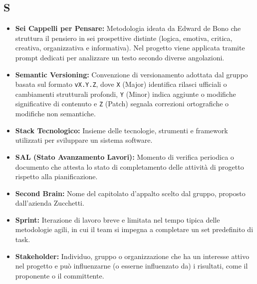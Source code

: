 \subsection*{S}
\begin{itemize}[leftmargin=*]
      \item \textbf{Sei Cappelli per Pensare:} Metodologia ideata da Edward de Bono che struttura il pensiero in sei prospettive distinte (logica, emotiva, critica, creativa, organizzativa e informativa). Nel progetto viene applicata tramite prompt dedicati per analizzare un testo secondo diverse angolazioni.
      \item \textbf{Semantic Versioning:} Convenzione di versionamento adottata dal
          gruppo basata sul formato \texttt{vX.Y.Z}, dove \texttt{X} (Major)
          identifica rilasci ufficiali o cambiamenti strutturali profondi,
          \texttt{Y} (Minor) indica aggiunte o modifiche significative di contenuto
          e \texttt{Z} (Patch) segnala correzioni ortografiche o modifiche non
          semantiche.
      \item \textbf{Stack Tecnologico:} Insieme delle tecnologie, strumenti e framework utilizzati per sviluppare un sistema software.
      \item \textbf{SAL (Stato Avanzamento Lavori):} Momento di verifica periodica o documento che attesta lo stato di completamento delle attività di progetto rispetto alla pianificazione.
      \item \textbf{Second Brain:} Nome del capitolato d'appalto scelto dal gruppo, proposto dall'azienda Zucchetti.
      \item \textbf{Sprint:} Iterazione di lavoro breve e limitata nel tempo tipica delle metodologie agili, in cui il team si impegna a completare un set predefinito di task.
      \item \textbf{Stakeholder:} Individuo, gruppo o organizzazione che ha un interesse attivo nel progetto e può influenzarne (o esserne influenzato da) i risultati, come il proponente o il committente.
\end{itemize}
 
{}
